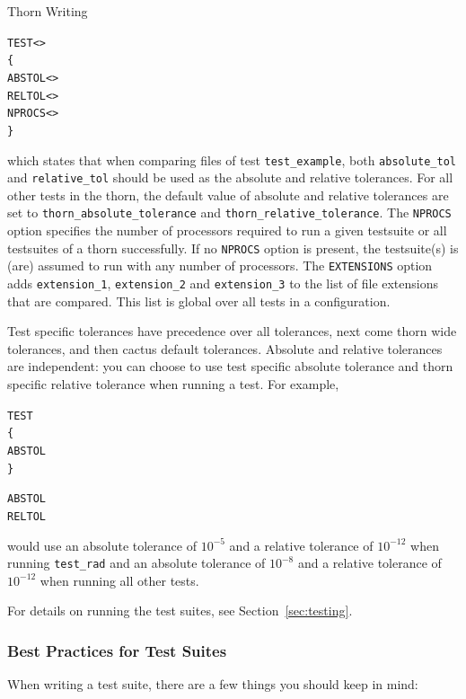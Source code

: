 \begin{cactuspart}{Thorn Writing}
\begin{alltt}
TEST <>
\{
  ABSTOL <>
  RELTOL <>
  NPROCS <>
\}
\end{alltt}

which states that when comparing files of test \verb|test_example|, both
\verb|absolute_tol| and \verb|relative_tol| should be used as
the absolute and relative tolerances. For all other tests in the
thorn, the default value of absolute and relative tolerances are set
to \verb|thorn_absolute_tolerance| and \verb|thorn_relative_tolerance|.
The \texttt{NPROCS} option specifies the number of processors required to
run a given testsuite  or all testsuites of a thorn
successfully. If no \texttt{NPROCS} option is present, the testsuite(s)
is (are) assumed to run with any number of processors.
The \texttt{EXTENSIONS} option adds
\verb|extension_1|, \verb|extension_2| and \verb|extension_3| to the
list of file extensions that are compared. This list is global over
all tests in a configuration.

Test specific tolerances have precedence over all tolerances, next
come thorn wide tolerances, and then cactus default tolerances.
Absolute and relative tolerances are independent: you can choose to
use test specific absolute tolerance and thorn specific relative
tolerance when running a test. For example,

\begin{alltt}
TEST 
\{
  ABSTOL 
\}

ABSTOL  
RELTOL  
\end{alltt}

would use an absolute tolerance of $10^{-5}$ and a relative tolerance of
$10^{-12}$ when running \verb|test_rad| and an absolute tolerance of $10^{-8}$
and a relative tolerance of $10^{-12}$ when running all other tests.

For details on running the test suites, see Section~\ref{sec:testing}.

\subsubsection{Best Practices for Test Suites}

When writing a test suite, there are a few things you should keep in
mind:


\end{cactuspart}
